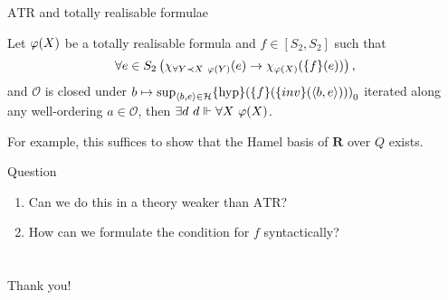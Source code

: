 \documentclass{beamer}
\makeatletter
\def\beamer@writeslidentry@miniframesoff{%
  \expandafter\beamer@ifempty\expandafter{\beamer@framestartpage}{}%
  {%
    \clearpage\beamer@notesactions%
  }
}
\newcommand*{\miniframesoff}{\let\beamer@writeslidentry=\beamer@writeslidentry@miniframesoff}
\newcommand{\tuple}[1]{\left\langle #1 \right\rangle}
\makeatother
\begin{document}
\begin{frame}{$\mathrm{ATR}$ and totally realisable formulae}
  \begin{theorem}
    Let $\varphi\mleft(X\mright)$ be a totally realisable formula and $f \in \left[S_2, S_2\right]$ such that
    \[\forall e \in S_2 \left(\chi_{\forall Y \prec X \ \varphi\mleft(Y\mright)}\mleft(e\mright) \rightarrow \chi_{\varphi\mleft(X\mright)}\mleft(\mleft\{f\mright\}\mleft(e\mright)\mright)\right),\]
    and $\mathcal{O}$ is closed under $b \mapsto \sup_{\tuple{b, e} \in \mathcal{H}} \mleft\{\mathrm{hyp}\mright\}\mleft(\mleft\{f\mright\}\mleft(\mleft\{inv\mright\}\mleft(\tuple{b, e}\mright)\mright)\mright)_0$ iterated along any well-ordering $a \in \mathcal{O}$, then $\exists d \ d \Vdash \forall X \ \varphi\mleft(X\mright)$.
  \end{theorem}

  \vspace*{8pt}

  For example, this suffices to show that the Hamel basis of $\mathbf{R}$ over $Q$ exists.

  \begin{block}{Question}
    \begin{enumerate}[label=(\roman*)]
      \item Can we do this in a theory weaker than $\mathrm{ATR}$?
      \item How can we formulate the condition for $f$ syntactically?
    \end{enumerate}
  \end{block}
\end{frame}

\section*{}

\miniframesoff

\begin{frame}
  \Large Thank you!
\end{frame}

\begin{frame}
  \renewcommand{\section}[2]{}
  \bibmain
\end{frame}
\end{document}
